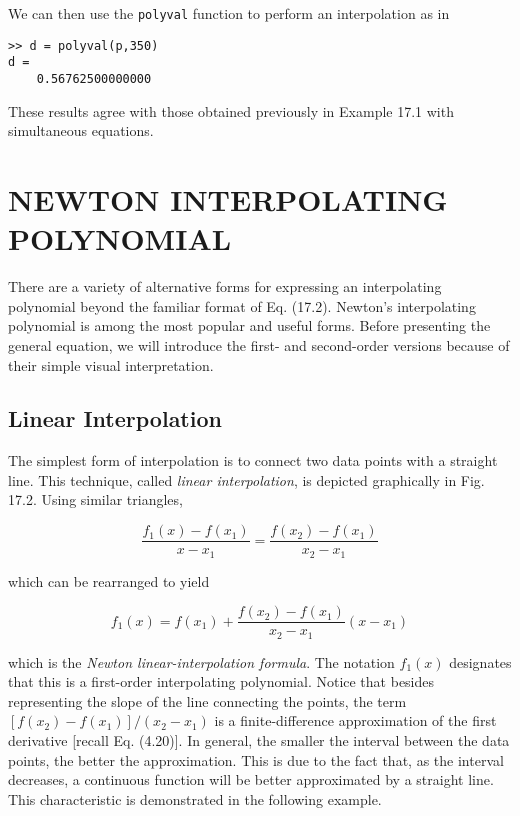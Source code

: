 \documentclass[../main.tex]{subfiles}
\begin{document}
\noindent We can then use the \texttt{polyval} function to perform an interpolation as in

\begin{lstlisting}[numbers=none]
>> d = polyval(p,350)
d =
	0.56762500000000
\end{lstlisting}

\noindent These results agree with those obtained previously in Example 17.1 with simultaneous equations.

\label{cha:cha_P_17_2}
\section{NEWTON INTERPOLATING POLYNOMIAL}

\noindent There are a variety of alternative forms for expressing an interpolating polynomial beyond
the familiar format of Eq. (17.2). Newton's interpolating polynomial is among the most
popular and useful forms. Before presenting the general equation, we will introduce the
first- and second-order versions because of their simple visual interpretation.

\label{cha:cha_P_17_2_1}
\subsection{Linear Interpolation}

\noindent The simplest form of interpolation is to connect two data points with a straight line. This
technique, called \textit{linear interpolation}, is depicted graphically in Fig. 17.2. Using similar
triangles,

\begin{equation}
	\tag{17.4}
	\frac{f_1(x)-f(x_1)}{x - x_1} = \frac{f(x_2) - f(x_1)}{x_2 - x_1}
\end{equation}

\noindent which can be rearranged to yield

\begin{equation}
	\tag{17.5}
	f_1(x) = f(x_1) + \frac{f(x_2) - f(x_1)}{x_2 - x_1} (x - x_1)
\end{equation}

\noindent which is the \textit{Newton linear-interpolation formula}. The notation $f_1 (x)$ designates that this
is a first-order interpolating polynomial. Notice that besides representing the slope of the
line connecting the points, the term $[f(x_2) - f(x_1)]/(x_2 - x_1)$ is a finite-difference approximation of the first derivative [recall Eq. (4.20)]. In general, the smaller the interval
between the data points, the better the approximation. This is due to the fact that, as the
interval decreases, a continuous function will be better approximated by a straight line.
This characteristic is demonstrated in the following example.
\end{document}
